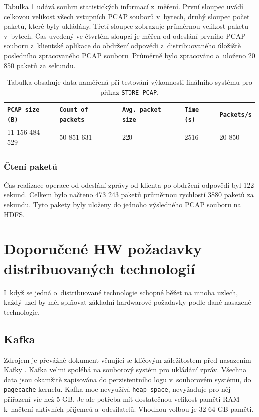\noindent Tabulka \ref{tablePerformanceFinalSystemBigData} udává souhrn statistických informací z~měření. První sloupec uvádí celkovou velikost všech vstupních PCAP souborů v~bytech, druhý sloupec počet paketů, které byly ukládány. Třetí sloupec zobrazuje průměrnou velikost paketu v~bytech. Čas uvedený ve čtvrtém sloupci je měřen od odeslání prvního PCAP souboru z~klientské aplikace do obdržení odpovědi z~distribuovaného úložiště posledního zpracovaného PCAP souboru. Průměrně bylo zpracováno a~uloženo 20 850 paketů za sekundu.

\begin{table}[h!]
    \centering
    \begin{tabular}{| l | l | l | l | l |}
    \hline
    \texttt{PCAP size (B)}   &   \texttt{Count of packets}   &   \texttt{Avg. packet size} &  \texttt{Time (s)} &   \texttt{Packets/s} \\ \hline
    11 156 484 529 & 50 851 631 & 220 & 2516 & 20 850 \\ \hline
    \end{tabular}\par
    \bigskip
    \caption{Tabulka obsahuje data naměřená při testování výkonnosti finálního systému pro příkaz \texttt{STORE\_PCAP}.}
    \label{tablePerformanceFinalSystemBigData}
\end{table}

\subsubsection{Čtení paketů}
Čas realizace operace od odeslání zprávy od klienta po obdržení odpovědi byl 122 sekund. Celkem bylo načteno 473 243 paketů průměrnou rychlostí 3880 paketů za sekundu. Tyto pakety byly uloženy do jednoho výsledného PCAP souboru na HDFS.

\section{Doporučené HW požadavky distribuovaných technologií}
I~když se jedná o~distribuované technologie schopné běžet na mnoha uzlech, každý uzel by měl splňovat základní hardwarové požadavky podle dané nasazené technologie.

\subsection{Kafka}
Zdrojem je převážně dokument věnující se klíčovým záležitostem před nasazením Kafky \cite{kafkaDeployment}. Kafka velmi spoléhá na souborový systém pro ukládání zpráv. Všechna data jsou okamžitě zapisována do perzistentního logu v~souborovém systému, do \texttt{pagecache} kernelu. Kafka moc nevyužívá \texttt{heap space}, nevyžaduje pro něj přiřazení víc než 5 GB.
Je ale potřeba mít dostatečnou velikost paměti RAM k~načtení aktivních příjemců a~odesílatelů. Vhodnou volbou je 32-64 GB paměti.

